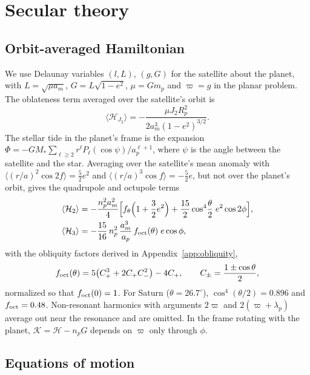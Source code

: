 \documentclass[11pt,a4paper]{article}
\newcommand{\foct}{f_{\rm oct}}
\begin{document}
\section{Secular theory}\label{sec:theory}

\subsection{Orbit-averaged Hamiltonian}

We use Delaunay variables $(l,L)$, $(g,G)$ for the satellite about the planet, with $L=\sqrt{\mu a_m}$, $G=L\sqrt{1-e^2}$, $\mu=Gm_p$ and $\varpi=g$ in the planar problem. The oblateness term averaged over the satellite's orbit is
\begin{equation}
\langle\mathcal H_{J_2}\rangle=-\frac{\mu J_2R_p^2}{2a_m^3(1-e^2)^{3/2}}.
\end{equation}
The stellar tide in the planet's frame is the expansion $\Phi=-GM_\ast\sum_{\ell\ge2}r^{\ell}P_\ell(\cos\psi)/a_p^{\ell+1}$, where $\psi$ is the angle between the satellite and the star. Averaging over the satellite's mean anomaly with $\langle(r/a)^2\cos2f\rangle=\tfrac52e^2$ and $\langle(r/a)^3\cos f\rangle=-\tfrac52e$, but not over the planet's orbit, gives the quadrupole and octupole terms
\begin{align}
\langle\mathcal H_2\rangle&=-\frac{n_p^2a_m^2}{4}\Big[f_\theta\Big(1+\frac{3}{2}e^2\Big)+\frac{15}{2}\cos^4\!\frac{\theta}{2}\;e^2\cos2\phi\Big],\label{eq:H2}\\
\langle\mathcal H_3\rangle&=-\frac{15}{16}\,n_p^2\,\frac{a_m^3}{a_p}\,\foct(\theta)\;e\cos\phi,\label{eq:H3}
\end{align}
with the obliquity factors derived in Appendix~\ref{app:obliquity},
\begin{equation}
\foct(\theta)=5\big(C_+^3+2C_+C_-^2\big)-4C_+,\qquad C_\pm=\frac{1\pm\cos\theta}{2},
\label{eq:foct}
\end{equation}
normalized so that $\foct(0)=1$. For Saturn ($\theta=26.7^\circ$), $\cos^4(\theta/2)=0.896$ and $\foct=0.48$. Non-resonant harmonics with arguments $2\varpi$ and $2(\varpi+\lambda_p)$ average out near the resonance and are omitted. In the frame rotating with the planet, $\mathcal K=\mathcal H-n_pG$ depends on $\varpi$ only through $\phi$.

\subsection{Equations of motion}
\end{document}

